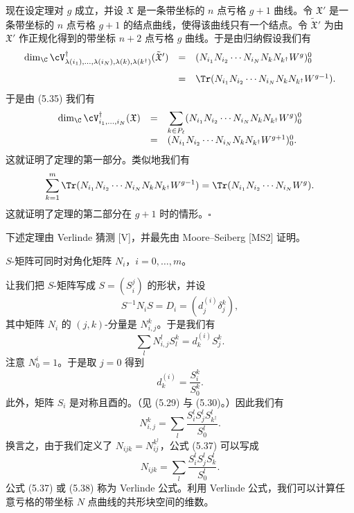 现在设定理对 $g$ 成立，并设 $\mathfrak X$ 是一条带坐标的 $n$ 点亏格 $g+1$ 曲线。令 $\mathfrak X'$ 是一条带坐标的 $n$ 点亏格 $g+1$ 的结点曲线，使得该曲线只有一个结点。令 $\tilde{\mathfrak X}'$ 为由 $\mathfrak X'$ 作正规化得到的带坐标 $n+2$ 点亏格 $g$ 曲线。于是由归纳假设我们有
\[
\begin{array}{rcl}
\dim_{\C}\cV^\dagger_{\lambda(i_1),\dots,\lambda(i_N),\lambda(k),\lambda(k^\dagger)}(\tilde{\mathfrak X}')
&=&(N_{i_1}N_{i_2}\cdots N_{i_N}N_kN_{k^\dagger}W^{g})^{0}_{0}\\[10pt]
&=&\Tr(N_{i_1}N_{i_2}\cdots N_{i_N}N_kN_{k^\dagger}W^{g-1}).
\end{array}
\]
于是由 (5.35) 我们有
\[
\begin{array}{rcl}
\dim_{\C}\cV^\dagger_{i_1,\dots,i_N}(\mathfrak X)
&=&\displaystyle\sum_{k\in P_\ell}
(N_{i_1}N_{i_2}\cdots N_{i_N}N_kN_{k^\dagger}W^{g})^{0}_{0}\\[10pt]
&=&(N_{i_1}N_{i_2}\cdots N_{i_N}N_kN_{k^\dagger}W^{g+1})^{0}_{0}.
\end{array}
\]
这就证明了定理的第一部分。类似地我们有
\[
\sum_{k=1}^{m}\Tr(N_{i_1}N_{i_2}\cdots N_{i_N}N_kN_{k^\dagger}W^{g-1})
=\Tr(N_{i_1}N_{i_2}\cdots N_{i_N}W^{g}).
\]
这就证明了定理的第二部分在 $g+1$ 时的情形。\hfill$\square$



下述定理由 Verlinde 猜测 [V]，并最先由 Moore–Seiberg [MS2] 证明。

\begin{theorem}[5.22]
$S$-矩阵可同时对角化矩阵 $N_i$，$i=0,\dots,m$。
\end{theorem}

让我们把 $S$-矩阵写成 $S=(S^j_i)$ 的形状，并设
\begin{equation}
S^{-1}N_iS=D_i=(d^{(i)}_j\delta^k_j), \tag{5.36}
\end{equation}
其中矩阵 $N_i$ 的 $(j,k)$-分量是 $N^k_{i,j}$。于是我们有
\[
\sum_l N^l_{i,j}S^k_l=d^{(i)}_kS^k_j.
\]
注意 $N^i_0=1$。于是取 $j=0$ 得到
\[
d^{(i)}_k=\frac{S^k_i}{S^k_0}.
\]
此外，矩阵 $S_i$ 是对称且酉的。（见 (5.29) 与 (5.30)。）因此我们有
\begin{equation}
N^k_{i,j}=\sum_l\frac{S^l_iS^l_jS^l_{k^\dagger}}{S^l_0}. \tag{5.37}
\end{equation}
换言之，由于我们定义了 $N_{ijk}=N^{k^\dagger}_{ij}$，公式 (5.37) 可以写成
\begin{equation}
N_{ijk}=\sum_l\frac{S^l_iS^l_jS^l_k}{S^l_0}. \tag{5.38}
\end{equation}
公式 (5.37) 或 (5.38) 称为 Verlinde 公式。利用 Verlinde 公式，我们可以计算任意亏格的带坐标 $N$ 点曲线的共形块空间的维数。

